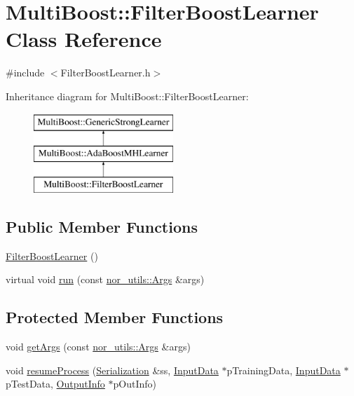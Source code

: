 \hypertarget{classMultiBoost_1_1FilterBoostLearner}{\section{Multi\-Boost\-:\-:Filter\-Boost\-Learner Class Reference}
\label{classMultiBoost_1_1FilterBoostLearner}
}


{\ttfamily \#include $<$Filter\-Boost\-Learner.\-h$>$}

Inheritance diagram for Multi\-Boost\-:\-:Filter\-Boost\-Learner\-:\begin{figure}[H]
\begin{center}
\leavevmode
\includegraphics[height=3.000000cm]{classMultiBoost_1_1FilterBoostLearner}
\end{center}
\end{figure}
\subsection*{Public Member Functions}
\begin{DoxyCompactItemize}
\item 
\hyperlink{classMultiBoost_1_1FilterBoostLearner_a87aa5f155d9b62127d6bb59fe12d3fd8}{Filter\-Boost\-Learner} ()
\item 
virtual void \hyperlink{classMultiBoost_1_1FilterBoostLearner_a3209ce71f29e342c84142d9623583109}{run} (const \hyperlink{classnor__utils_1_1Args}{nor\-\_\-utils\-::\-Args} \&args)
\end{DoxyCompactItemize}
\subsection*{Protected Member Functions}
\begin{DoxyCompactItemize}
\item 
void \hyperlink{classMultiBoost_1_1FilterBoostLearner_a9bc7ce4a8a308d303810d8f15036b5d2}{get\-Args} (const \hyperlink{classnor__utils_1_1Args}{nor\-\_\-utils\-::\-Args} \&args)
\item 
void \hyperlink{classMultiBoost_1_1FilterBoostLearner_a54fed5a1a3e0a4556f33b3eeb80349e0}{resume\-Process} (\hyperlink{classMultiBoost_1_1Serialization}{Serialization} \&ss, \hyperlink{classMultiBoost_1_1InputData}{Input\-Data} $\ast$p\-Training\-Data, \hyperlink{classMultiBoost_1_1InputData}{Input\-Data} $\ast$p\-Test\-Data, \hyperlink{classMultiBoost_1_1OutputInfo}{Output\-Info} $\ast$p\-Out\-Info)
\end{DoxyCompactItemize}
